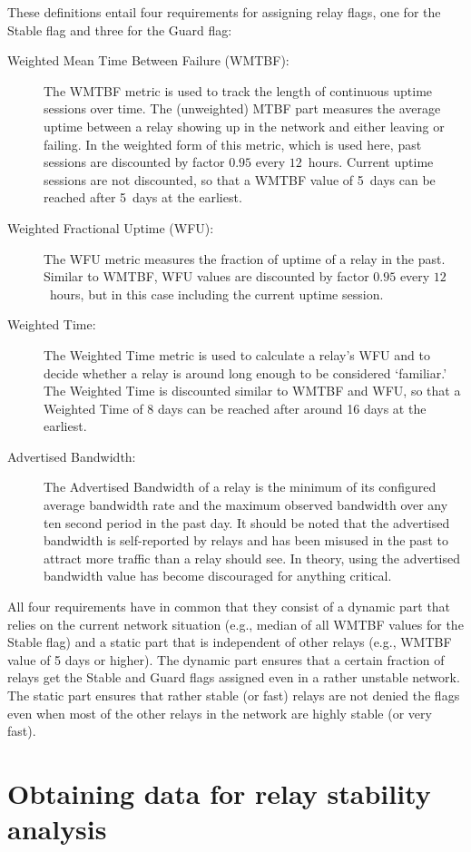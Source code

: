 \documentclass{article}
\begin{document}
These definitions entail four requirements for assigning relay flags, one
for the Stable flag and three for the Guard flag:
\begin{description}
\item[Weighted Mean Time Between Failure (WMTBF):]
The WMTBF metric is used to track the length of continuous uptime sessions
over time.
The (unweighted) MTBF part measures the average uptime between a relay
showing up in the network and either leaving or failing.
In the weighted form of this metric, which is used here, past sessions
are discounted by factor $0.95$ every $12$~hours.
Current uptime sessions are not discounted, so that a WMTBF value of
5~days can be reached after 5~days at the earliest.
\item[Weighted Fractional Uptime (WFU):] The WFU metric measures the
fraction of uptime of a relay in the past.
Similar to WMTBF, WFU values are discounted by factor $0.95$ every
$12$~hours, but in this case including the current uptime session.
\item[Weighted Time:] The Weighted Time metric is used to calculate a
relay's WFU and to decide whether a relay is around long enough to be
considered `familiar.'
The Weighted Time is discounted similar to WMTBF and WFU, so that a
Weighted Time of 8 days can be reached after around 16 days at the
earliest.
\item[Advertised Bandwidth:] The Advertised Bandwidth of a relay is the
minimum of its configured average bandwidth rate and the maximum observed
bandwidth over any ten second period in the past day.
It should be noted that the advertised bandwidth is self-reported by
relays and has been misused in the past to attract more traffic than a
relay should see.
In theory, using the advertised bandwidth value has become discouraged
for anything critical.
\end{description}

All four requirements have in common that they consist of a dynamic part
that relies on the current network situation (e.g., median of all WMTBF
values for the Stable flag) and a static part that is independent
of other relays (e.g., WMTBF value of 5 days or higher).
The dynamic part ensures that a certain fraction of relays get the
Stable and Guard flags assigned even in a rather unstable network.
The static part ensures that rather stable (or fast) relays are not denied
the flags even when most of the other relays in the network are highly
stable (or very fast).

\section{Obtaining data for relay stability analysis}
\end{document}
